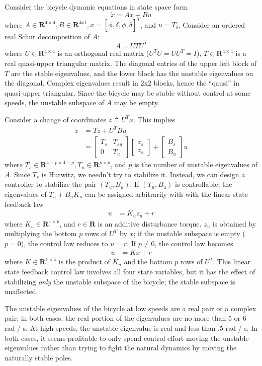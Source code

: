 \documentclass[letterpaper,11pt]{article}
\begin{document}
Consider the bicycle dynamic equations in state space form
\[
  \dot{x} = A x + B u
\]
where $A \in \mathbf{R}^{4 \times 4}, B \in \mathbf{R}^{4 x 1}, x = \left[\phi,
\delta, \dot{\phi}, \dot{\delta} \right]^T$, and $u = T_\delta$. Consider an
ordered real Schur decomposition of $A$:
\[
  A = UTU^T
\]
where $U \in \mathbf{R}^{4 \times 4}$ is an orthogonal real matrix ($U^TU =
UU^T = I$), $T\in\mathbf{R}^{4 \times 4}$ is a real quasi-upper triangular
matrix. The diagonal entries of the upper left block of $T$ are the stable
eigenvalues, and the lower block has the unstable eigenvalues on the diagonal.
Complex eigenvalues result in 2x2 blocks, hence the ``qausi'' in quasi-upper
triangular.  Since the bicycle may be stable without control at some speeds,
the unstable subspace of $A$ may be empty.

Consider a change of coordinates $z \triangleq U^T x$.  This implies
\begin{align*}
\dot{z} &= Tz + U^TBu\\
&= \left[\begin{smallmatrix}T_{s} & T_{su} \\ 0 & T_{u}
\end{smallmatrix}\right]\left[\begin{smallmatrix}z_s \\ z_u
\end{smallmatrix}\right] + \left[\begin{smallmatrix}B_s \\
B_u\end{smallmatrix}\right] u
\end{align*}
where $T_s \in \mathbf{R}^{4-p \times 4-p}, T_u \in \mathbf{R}^{p \times p}$,
and $p$ is the number of unstable eigenvalues of $A$. Since $T_s$ is Hurwitz,
we needn't try to stabilize it.  Instead, we can design a controller to
stabilize the pair $(T_u, B_u)$.  If $(T_u, B_u)$ is controllable, the
eigenvalues of $T_u + B_u K_u$ can be assigned arbitrarily with with the linear
state feedback law
\begin{align*}
  u &= K_u z_u + r
\end{align*}
where $K_u \in \mathbf{R}^{1 \times p}$, and $r \in \mathbf{R}$ is an additive
disturbance torque. $z_u$ is obtained by multiplying the bottom $p$ rows of
$U^T$ by $x$; if the unstable subspace is empty ($p=0$), the control law
reduces to $u = r$. If $p\ne0$, the control law becomes
\begin{align*}
  u &= K x + r
\end{align*}
where $K\in\mathbf{R}^{1 \times 4}$ is the product of $K_u$ and the bottom $p$
rows of $U^T$.  This linear state feedback control law involves all four state
variables, but it has the effect of stabilizing \textit{only} the unstable
subspace of the bicycle; the stable subspace is unaffected.

The unstable eigenvalues of the bicycle at low speeds are a real pair or a
complex pair; in both cases, the real portion of the eigenvalues are no more
than 5 or 6 rad / s. At high speeds, the unstable eigenvalue is real and less than
.5 rad / s.  In both cases, it seems profitable to only spend control effort
moving the unstable eigenvalues rather than trying to fight the natural
dynamics by moving the naturally stable poles.
\end{document}
